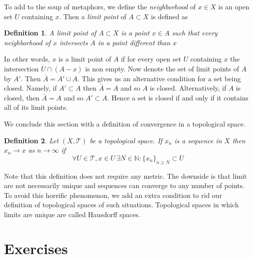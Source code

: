 \documentclass{article}
\newcommand{\Ta}{\mathcal{T}}
\newcommand{\N}{\mathbb{N}}
\newtheorem*{definition}{Definition}
\theoremstyle{remark}
\begin{document}
To add to the soup of metaphors, we define the \textit{neighborhood} of $x\in X$ is an open set $U$ containing $x$. Then a \textit{limit point} of $A\subset X$ is defined as
\begin{definition}
    A limit point of $A\subset X$ is a point $x\in A$ such that every neighborhood of $x$ intersects $A$ in a point different than $x$
\end{definition}
In other words, $x$ is a limit point of $A$ if for every open set $U$ containing $x$ the intersection $U\cap(A-{x})$ is non empty. Now denote the set of limit points of $A$ by $A'$.
Then $\bar{A}=A'\cup A$. This gives us an alternative condition for a set being closed. Namely, if $A'\subset A$ then $\bar{A}=A$ and so $A$ is closed.
Alternatively, if $A$ is closed, then $\bar{A}=A$ and so $A'\subset A$.
Hence a set is closed if and only if it contains all of its limit points.

We conclude this section with a definition of convergence in a topological space.
\begin{definition}
    Let $(X,\Ta)$ be a topological space. If $x_n$ is a sequence in $X$ then $x_n\to x$ as $n\to\infty$ if
    $$
        \forall U\in\Ta, x\in U\,\exists N\in\N: \{x_n\}_{n\geq N}\subset U
    $$
\end{definition}
Note that this definition does not require any metric. The downside is that limit are not necessarily unique and sequences can converge to any number of points.
To avoid this horrific phenomenon, we add an extra condition to rid our definition of topological spaces of such situations. Topological spaces in which limits are unique are called Hausdorff spaces.


\newpage
\section{Exercises}

    
\end{document}
